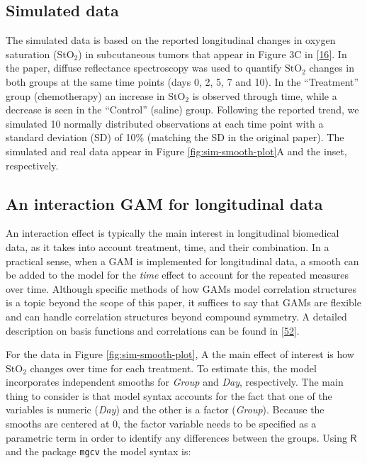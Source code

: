 \documentclass[
]{article}
\newcommand{\passthrough}[1]{#1}
\begin{document}
\hypertarget{simulated-data}{%
\subsection{Simulated data}\label{simulated-data}}

The simulated data is based on the reported longitudinal changes in oxygen saturation (\(\mbox{StO}_2\)) in subcutaneous tumors that appear in Figure 3C in {[}\protect\hyperlink{ref-vishwanath2009}{16}{]}. In the paper, diffuse reflectance spectroscopy was used to quantify \(\mbox{StO}_2\) changes in both groups at the same time points (days 0, 2, 5, 7 and 10). In the ``Treatment'' group (chemotherapy) an increase in \(\mbox{StO}_2\) is observed through time, while a decrease is seen in the ``Control'' (saline) group. Following the reported trend, we simulated 10 normally distributed observations at each time point with a standard deviation (SD) of 10\% (matching the SD in the original paper).
The simulated and real data appear in Figure \ref{fig:sim-smooth-plot}A and the inset, respectively.

\hypertarget{an-interaction-gam-for-longitudinal-data}{%
\subsection{An interaction GAM for longitudinal data}\label{an-interaction-gam-for-longitudinal-data}}

An interaction effect is typically the main interest in longitudinal biomedical data, as it takes into account treatment, time, and their combination. In a practical sense, when a GAM is implemented for longitudinal data, a smooth can be added to the model for the \emph{time} effect to account for the repeated measures over time. Although specific methods of how GAMs model correlation structures is a topic beyond the scope of this paper, it suffices to say that GAMs are flexible and can handle correlation structures beyond compound symmetry. A detailed description on basis functions and correlations can be found in {[}\protect\hyperlink{ref-hefley2017}{52}{]}.

For the data in Figure \ref{fig:sim-smooth-plot}, A the main effect of interest is how \(\mbox{StO}_2\) changes over time for each treatment. To estimate this, the model incorporates independent smooths for \emph{Group} and \emph{Day}, respectively. The main thing to consider is that model syntax accounts for the fact that one of the variables is numeric (\emph{Day}) and the other is a factor (\emph{Group}). Because the smooths are centered at 0, the factor variable needs to be specified as a parametric term in order to identify any differences between the groups. Using \(\textsf{R}\) and the package \passthrough{\lstinline!mgcv!} the model syntax is:
\end{document}
